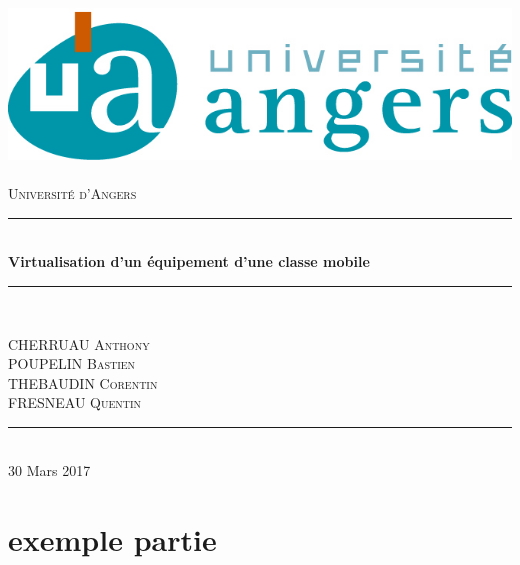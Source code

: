 \documentclass[a4paper,12pt]{article}
\newcommand{\HRule}{\rule{\linewidth}{0.5mm}}
\begin{document}
\begin{titlepage}
  \begin{sffamily}
  \begin{center}

    \includegraphics[scale=1]{univangers.jpg}~\\[1.5cm]

    \textsc{\LARGE Université d'Angers}\\[2cm]

   

    \HRule \\[0.4cm]
    { \huge \bfseries Virtualisation d'un équipement d'une classe mobile}{\bfseries  \\[0.4cm] }

    \HRule \\[2cm]
    

    \begin{minipage}{0.4\textwidth}
      \begin{flushleft} \large
        CHERRUAU \textsc{Anthony}\\
        POUPELIN \textsc{Bastien}\\
        THEBAUDIN \textsc{Corentin}\\
        FRESNEAU \textsc{Quentin}
      \end{flushleft}
    \end{minipage}
    

    \vfill
    \HRule\\[2cm]
    {\large 30 Mars 2017}

  \end{center}
  \end{sffamily}
\end{titlepage}
\clearpage

\tableofcontents

\clearpage



\section{exemple partie}
\end{document}
